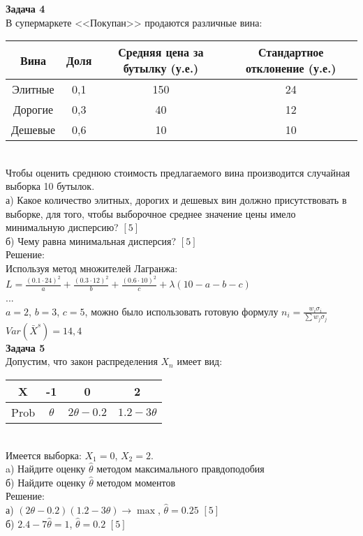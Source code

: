 \documentclass[pdftex,12pt,a4paper]{article}
\begin{document}
\textbf{Задача 4} \\ %
В супермаркете <<Покупан>> продаются различные вина: \\
\begin{tabular}{|c|c|c|c|}
  \hline
  Вина & Доля & Средняя цена за бутылку (у.е.) & Стандартное отклонение (у.е.) \\
  \hline
  Элитные & 0,1 & 150 & 24 \\
  Дорогие & 0,3 & 40 & 12 \\
  Дешевые & 0,6 & 10 & 10 \\
  \hline
\end{tabular} \\
Чтобы оценить среднюю стоимость предлагаемого вина производится
случайная выборка 10 бутылок. \\
а) Какое количество элитных, дорогих и дешевых вин должно
присутствовать в выборке, для того, чтобы выборочное среднее
значение цены имело минимальную дисперсию? $[5]$ \\
б) Чему равна минимальная дисперсия? $[5]$ \\
Решение: \\
Используя метод множителей Лагранжа: \\
$L=\frac{(0.1\cdot 24)^{2}}{a}+\frac{(0.3\cdot
12)^{2}}{b}+\frac{(0.6\cdot 10)^{2}}{c}+\lambda(10-a-b-c)$\\
... \\
$a=2$, $b=3$, $c=5$, можно было использовать готовую формулу
$n_{i}=\frac{w_{i}\sigma_{i}}{\sum w_{j}\sigma_{j}}$ \\
$Var(\bar{X}^{s})=14,4$ \\



\textbf{Задача 5} \\ %
Допустим, что закон распределения $X_{n}$ имеет вид: \\
\begin{tabular}{|c|c|c|c|}
  \hline
  X & -1 & 0 & 2 \\
  \hline
  Prob & $\theta$ & $2\theta-0.2$ & $1.2-3\theta$ \\
  \hline
\end{tabular} \\
Имеется выборка: $X_{1}=0$, $X_{2}=2$. \\
a) Найдите оценку $\hat{\theta}$ методом максимального правдоподобия \\
б) Найдите оценку $\hat{\theta}$ методом моментов \\
Решение: \\
а) $(2\theta-0.2)(1.2-3\theta)\rightarrow\max$,
$\hat{\theta}=0.25$ $[5]$\\
б) $2.4-7\hat{\theta}=1$, $\hat{\theta}=0.2$ $[5]$\\
\end{document}
